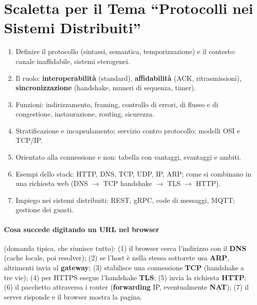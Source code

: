 \section{Scaletta per il Tema ``Protocolli nei Sistemi Distribuiti''}
\begin{enumerate}
    \item Definire il protocollo (sintassi, semantica, temporizzazione) e il contesto: canale inaffidabile, sistemi eterogenei.
    \item Il ruolo: \textbf{interoperabilità} (standard), \textbf{affidabilità} (ACK, ritrasmissioni), \textbf{sincronizzazione} (handshake, numeri di sequenza, timer).
    \item Funzioni: indirizzamento, framing, controllo di errori, di flusso e di congestione, instaurazione, routing, sicurezza.
    \item Stratificazione e incapsulamento; servizio contro protocollo; modelli OSI e TCP/IP.
    \item Orientato alla connessione e non: tabella con vantaggi, svantaggi e ambiti.
    \item Esempi dello stack: HTTP, DNS, TCP, UDP, IP, ARP; come si combinano in una richiesta web (DNS $\to$ TCP handshake $\to$ TLS $\to$ HTTP).
    \item Impiego nei sistemi distribuiti: REST, gRPC, code di messaggi, MQTT; gestione dei guasti.
\end{enumerate}

\paragraph{Cosa succede digitando un URL nel browser} (domanda tipica, che riunisce tutto): (1) il browser cerca l'indirizzo con il \textbf{DNS} (cache locale, poi resolver); (2) se l'host è nella stessa sottorete usa \textbf{ARP}, altrimenti invia al \textbf{gateway}; (3) stabilisce una connessione \textbf{TCP} (handshake a tre vie); (4) per HTTPS esegue l'handshake \textbf{TLS}; (5) invia la richiesta \textbf{HTTP}; (6) il pacchetto attraversa i router (\textbf{forwarding} IP, eventualmente \textbf{NAT}); (7) il server risponde e il browser mostra la pagina.
